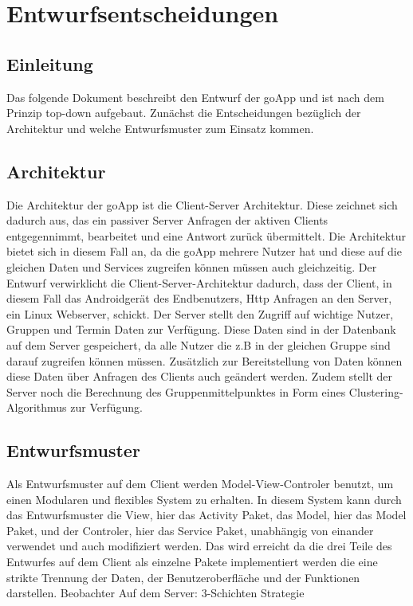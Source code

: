 

\section{Entwurfsentscheidungen}
	\subsection{Einleitung}
	Das folgende Dokument beschreibt den Entwurf der goApp und ist nach dem Prinzip top-down aufgebaut.
	Zunächst die Entscheidungen bezüglich der Architektur und welche Entwurfsmuster zum Einsatz kommen.
	\subsection{Architektur}
	Die Architektur der goApp ist die Client-Server Architektur. Diese zeichnet sich dadurch aus, das ein passiver Server Anfragen der aktiven Clients entgegennimmt, bearbeitet und eine Antwort zurück übermittelt. Die Architektur bietet sich in diesem Fall an, da die goApp mehrere Nutzer hat und diese auf die gleichen Daten und Services zugreifen können müssen auch gleichzeitig. 
	Der Entwurf verwirklicht die Client-Server-Architektur dadurch, dass der Client, in diesem Fall das Androidgerät des Endbenutzers, Http Anfragen an den Server, ein Linux Webserver, schickt. Der Server stellt den Zugriff auf wichtige Nutzer, Gruppen und Termin Daten zur Verfügung. Diese Daten sind in der Datenbank auf dem Server gespeichert, da alle Nutzer die z.B in der gleichen Gruppe sind darauf zugreifen können müssen.  Zusätzlich zur Bereitstellung von Daten können diese Daten über Anfragen des Clients auch geändert werden. Zudem stellt der Server noch die Berechnung des Gruppenmittelpunktes in Form eines Clustering-Algorithmus zur Verfügung. 
	
	\subsection{Entwurfsmuster}
	Als Entwurfsmuster auf dem Client werden Model-View-Controler benutzt, um einen Modularen und flexibles System zu erhalten.
	In diesem System kann durch das Entwurfsmuster die View, hier das Activity Paket, das Model, hier das Model Paket, und der Controler, hier das Service Paket, unabhängig von einander verwendet und auch modifiziert werden. Das wird erreicht da die drei Teile des Entwurfes auf dem Client als einzelne Pakete implementiert werden die eine strikte Trennung der Daten, der Benutzeroberfläche und der Funktionen darstellen. 
	\newline
	Beobachter
	\newline
	Auf dem Server:
	3-Schichten
	\newline
	Strategie
